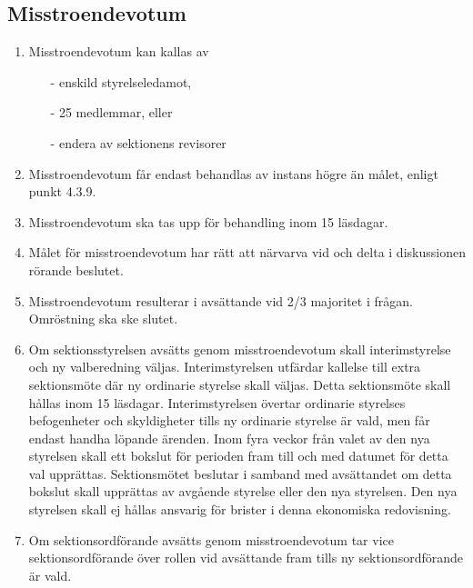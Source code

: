 \documentclass[11pt,a4paper]{article}
\begin{document}
\subsection{Misstroendevotum}
\label{subsec:misstroende}

\begin{enumerate}[\thesubsection .1]

   \item Misstroendevotum kan kallas av
		\begin{itemize}
			\item[-] enskild styrelseledamot, 
			\item[-] 25 medlemmar, eller
			\item[-] endera av sektionens revisorer
		\end{itemize}
	
	\item Misstroendevotum får endast behandlas av instans högre än målet, enligt punkt 4.3.9. %
	

	\item Misstroendevotum ska tas upp för behandling inom 15 läsdagar.

	\item Målet för misstroendevotum har rätt att närvarva vid och delta i diskussionen rörande beslutet.

	\item Misstroendevotum resulterar i avsättande vid 2/3 majoritet i frågan. Omröstning ska ske slutet. 

	\item Om sektionsstyrelsen avsätts genom misstroendevotum skall interimstyrelse och ny valberedning väljas. Interimstyrelsen utfärdar kallelse till extra sektionsmöte där ny ordinarie styrelse skall väljas. Detta sektionsmöte skall hållas inom 15 läsdagar. Interimstyrelsen övertar ordinarie styrelses befogenheter och skyldigheter tills ny ordinarie styrelse är vald, men får endast handha löpande ärenden. Inom fyra veckor från valet av den nya styrelsen skall ett bokslut för perioden fram till och med datumet för detta val upprättas. Sektionsmötet beslutar i samband med avsättandet om detta bokslut skall upprättas av avgående styrelse eller den nya styrelsen. Den nya styrelsen skall ej hållas ansvarig för brister i denna ekonomiska redovisning.

	\item Om sektionsordförande avsätts genom misstroendevotum tar vice sektionsordförande över rollen vid avsättande fram tills ny sektionsordförande är vald.


\end{enumerate}
\end{document}
